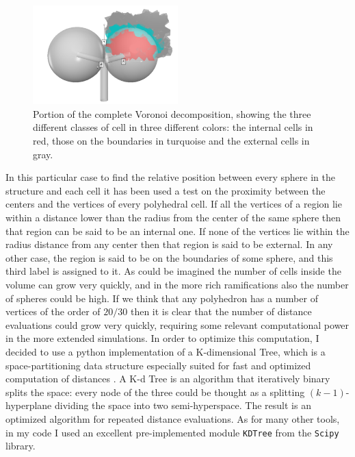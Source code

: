     \begin{figure}
        \centering
        \includegraphics[width = 0.5\textwidth]{images/cell_id}
        \caption{Portion of the complete Voronoi decomposition, showing the three different classes of cell in three different colors: the internal cells in red, those on the boundaries in turquoise and the external cells in gray.}
        \label{fig:cell_id}
    \end{figure}

    In this particular case to find the relative position between every sphere in the structure and each cell it has been used a test on the proximity between the centers and the vertices of every polyhedral cell. If all the vertices of a region lie within a distance lower than the radius from the center of the same sphere then that region can be said to be an internal one. If none of the vertices lie within the radius distance from any center then that region is said to be external. In any other case, the region is said to be on the boundaries of some sphere, and this third label is assigned to it. As could be imagined the number of cells inside the volume can grow very quickly, and in the more rich ramifications also the number of spheres could be high. If we think that any polyhedron has a number of vertices of the order of $20/30$ then it is clear that the number of distance evaluations could grow very quickly, requiring some relevant computational power in the more extended simulations. In order to optimize this computation, I decided to use a python implementation of a K-dimensional Tree, which is a space-partitioning data structure especially suited for fast and optimized computation of distances \cite{10.1145/361002.361007}. A K-d Tree is an algorithm that iteratively binary splits the space: every node of the three could be thought as a splitting $(k-1)$-hyperplane dividing the space into two semi-hyperspace. The result is an optimized algorithm for repeated distance evaluations. As for many other tools, in my code I used an excellent pre-implemented module \texttt{KDTree} from the \texttt{Scipy} library.

